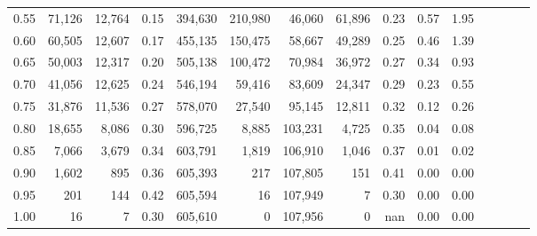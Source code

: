 \begin{tabular}{rrrcrrrrrrrrrrr}
0.55 &  71,126 &  12,764 &                                       0.15 &  394,630 &  210,980 &   46,060 &   61,896 &  0.23 &  0.57 &                         1.95 \\
0.60 &  60,505 &  12,607 &                                       0.17 &  455,135 &  150,475 &   58,667 &   49,289 &  0.25 &  0.46 &                         1.39 \\
0.65 &  50,003 &  12,317 &                                       0.20 &  505,138 &  100,472 &   70,984 &   36,972 &  0.27 &  0.34 &                         0.93 \\
0.70 &  41,056 &  12,625 &                                       0.24 &  546,194 &   59,416 &   83,609 &   24,347 &  0.29 &  0.23 &                         0.55 \\
0.75 &  31,876 &  11,536 &                                       0.27 &  578,070 &   27,540 &   95,145 &   12,811 &  0.32 &  0.12 &                         0.26 \\
0.80 &  18,655 &   8,086 &                                       0.30 &  596,725 &    8,885 &  103,231 &    4,725 &  0.35 &  0.04 &                         0.08 \\
0.85 &   7,066 &   3,679 &                                       0.34 &  603,791 &    1,819 &  106,910 &    1,046 &  0.37 &  0.01 &                         0.02 \\
0.90 &   1,602 &     895 &                                       0.36 &  605,393 &      217 &  107,805 &      151 &  0.41 &  0.00 &                         0.00 \\
0.95 &     201 &     144 &                                       0.42 &  605,594 &       16 &  107,949 &        7 &  0.30 &  0.00 &                         0.00 \\
1.00 &      16 &       7 &                                       0.30 &  605,610 &        0 &  107,956 &        0 &   nan &  0.00 &                         0.00 \\
\bottomrule
\end{tabular}
